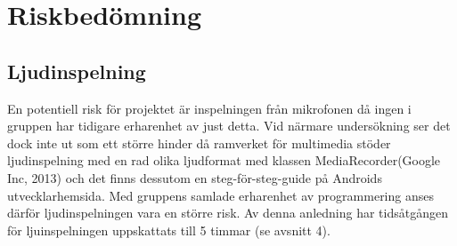 \section{Riskbedömning}
\subsection{Ljudinspelning}
En potentiell risk för projektet är inspelningen från mikrofonen då ingen i gruppen har tidigare erharenhet av just detta. Vid närmare undersökning ser det dock inte ut som ett större hinder då ramverket för multimedia stöder ljudinspelning med en rad olika ljudformat med klassen MediaRecorder(Google Inc, 2013) och det finns dessutom en steg-för-steg-guide på Androids utvecklarhemsida. Med gruppens samlade erharenhet av programmering anses därför ljudinspelningen vara en större risk. Av denna anledning har tidsåtgången för ljuinspelningen uppskattats till 5 timmar (se avsnitt 4).